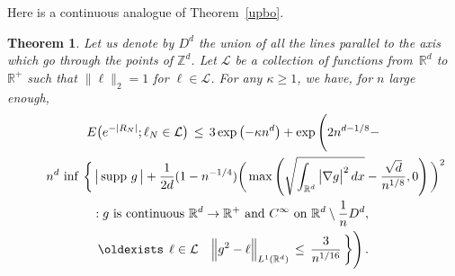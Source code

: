 \documentclass[10pt]{amsart}
\newtheorem{theo}{Theorem}[section]
\theoremstyle{definition}\newtheorem{defi}[theo]{Definition}\newtheorem{rema}[theo]{Remark}\newtheorem{exam}[theo]{Example}\newtheorem{exem}[theo]{Example}\newtheorem{nota}[theo]{Notation}
\newcommand*\supp{\text{supp\,}}
\newcommand*\Zd {{\mathbb Z^d}}
\newcommand*\Rd {{\mathbb R^d}}
\newcommand*\R{\mathbb{R}}
\newcommand{\cL}{\mathcal{L}}
\renewcommand*{\exists}{\mathrel{\oldexists}}
\begin{document}
Here is a continuous analogue of Theorem~\ref{upbo}.
\begin{theo}\label{cupbo}
Let us denote by $D^d$ the union of all the lines parallel to the axis which go through the points of $\Zd$. Let $\cL$ be a collection of functions from~$\Rd$ to $\R^+$ such that $\big\| \ell\big\|_2=1$ for $\ell\in\cL$. For any $\kappa\geq 1$, we have, for $n$ large enough,
\begin{multline*}
E\big(e^{-|R_N|};
\ell_N\in\cL\big)\,\leq\, 3\exp\left(-\kappa n^d\right)+
\exp\Bigg(2n^{d-1/8}-
\\
\qquad n^d\,\inf\,\bigg\{\,
\big|\,\supp\,g\,\big| +
\frac{1} {2d} (1-n^{-1/4})
\bigg(\max\left(
\sqrt{
\int_{\Rd}\big|\nabla g\big|^2\,dx }-
\frac{\sqrt{d}}{n^{1/8}},0\right) \bigg)^2
\hfill\\
\hfill :g\text{ is continuous } \Rd\to\R^+
\text{ and }C^\infty\text{ on }\Rd\setminus \frac{1}{n}D^d,\,
\hfill\\
\exists\,\ell\in\cL\quad
\Big\|g^2- \ell\Big\|_{L^1(\Rd)}
\,\leq\,
\frac{3}{n^{1/16}}
\,\bigg\}\Bigg)\,.
\end{multline*}
\end{theo}
\end{document}

